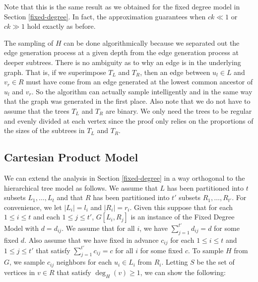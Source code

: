 Note that this is the same result as we obtained for the fixed degree
model in Section \ref{fixed-degree}. In fact, the approximation
guarantees when $ck \ll 1$ or $ck \gg 1$ hold exactly as before.\vs

The sampling of $H$ can be done algorithmically because we separated
out the edge generation process at a given depth from the edge
generation process at deeper subtrees. There is no ambiguity as to why
an edge is in the underlying graph. That is, if we superimpose $T_L$
and $T_R$, then an edge between $u_l\in L$ and $v_r\in R$ must have
come from an edge generated at the lowest common ancestor of $u_l$ and
$v_r$. So the algorithm can actually sample intelligently and in the
same way that the graph was generated in the first place. Also note
that we do not have to assume that the trees $T_L$ and $T_R$ are
binary. We only need the trees to be regular and evenly divided at
each vertex since the proof only relies on the proportions of the
sizes of the subtrees in $T_L$ and $T_R$.


\subsection{Cartesian Product Model}
\label{cartesian}
We can extend the analysis in Section \ref{fixed-degree} in a way
orthogonal to the hierarchical tree model as follows. We assume that
$L$ has been partitioned into $t$ subsets $L_1,\ldots, L_t$ and
that $R$ has been partitioned into $t'$ subsets $R_1,\ldots,
R_{t'}$. For convenience, we let $|L_i| = l_i$ and $|R_i|=r_i$. Given
this suppose that for each $1\leq i\leq t$ and each $1\leq j\leq t'$,
$G[L_i, R_j]$ is an instance of the Fixed Degree Model with
$d=d_{ij}$. We assume that for all $i$, we have $\sum_{j=1}^{t'}
d_{ij} = d$ for some fixed $d$. Also assume that we have fixed in
advance $c_{ij}$ for each $1\leq i\leq t$ and $1\leq j\leq t'$ that
satisfy $\sum_{j=1}^{t'} c_{ij} = c$ for all $i$ for some fixed $c$.
To sample $H$ from $G$, we sample $c_{ij}$ neighbors for each 
$u_i\in L_i$ from $R_i$. Letting $S$ be the set of vertices in 
$v\in R$ that satisfy $\deg_H(v)\geq 1$, we can show the following:

